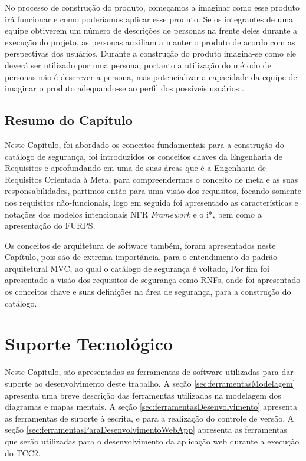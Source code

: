 No processo de construção do produto, começamos a imaginar como esse produto irá funcionar e como poderíamos aplicar esse produto\cite{soegaard2012encyclopedia}. Se os integrantes de uma equipe obtiverem um número de descrições de personas na frente deles durante a execução do projeto, as personas auxiliam a manter o produto de acordo com as perspectivas dos usuários. Durante a construção do produto imagina-se como ele deverá ser utilizado por uma persona, portanto a utilização do método de personas não é descrever a persona, mas potencializar a capacidade da equipe de imaginar o produto adequando-se ao perfil dos possíveis usuários \cite{soegaard2012encyclopedia}.  


\section{Resumo do Capítulo}

Neste Capítulo, foi abordado os conceitos fundamentais para a construção do catálogo de segurança, foi introduzidos os conceitos chaves da Engenharia de Requisitos e aprofundando em uma de suas áreas que é a Engenharia de Requisitos Orientada à Meta, para compreendermos o conceito de meta e as suas responsabilidades, partimos então para uma visão dos requisitos, focando somente nos requisitos não-funcionais, logo em seguida foi apresentado as características e notações dos modelos intencionais NFR \textit{Framework} e o i*, bem como a apresentação do FURPS. 

Os conceitos de arquitetura de software também, foram apresentados neste Capítulo, pois são de extrema importância, para o entendimento do padrão arquitetural MVC, ao qual o catálogo de segurança é voltado, Por fim foi apresentado a visão dos requisitos de segurança como RNFs, onde foi apresentado os conceitos chave e suas definições na área de segurança, para a construção do catálogo. 



\chapter{Suporte Tecnológico}
\label{chap:suporteTecnologico}

Neste Capítulo, são apresentadas as ferramentas de software utilizadas para dar suporte ao desenvolvimento deste trabalho. A seção \ref{sec:ferramentasModelagem} apresenta uma breve descrição das ferramentas utilizadas na modelagem dos diagramas e mapas mentais. A seção \ref{sec:ferramentasDesenvolvimento} apresenta as ferramentas de suporte à escrita, e para a realização do controle de versão. A seção \ref{sec:ferramentasParaDesenvolvimentoWebApp} apresenta as ferramentas que serão utilizadas para o desenvolvimento da aplicação web durante a execução do TCC2.  

